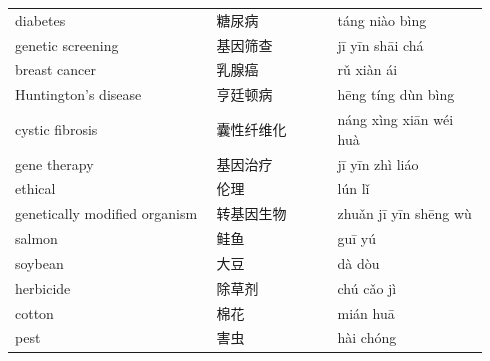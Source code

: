 \documentclass[11pt]{article}
\begin{document}
\begin{longtable}{@{}p{0.40\linewidth}p{0.24\linewidth}p{0.30\linewidth}@{}}
diabetes & 糖尿病 & táng niào bìng \\
genetic screening & 基因筛查 & jī yīn shāi chá \\
breast cancer & 乳腺癌 & rǔ xiàn ái \\
Huntington's disease & 亨廷顿病 & hēng tíng dùn bìng \\
cystic fibrosis & 囊性纤维化 & náng xìng xiān wéi huà \\
gene therapy & 基因治疗 & jī yīn zhì liáo \\
ethical & 伦理 & lún lǐ \\
genetically modified organism & 转基因生物 & zhuǎn jī yīn shēng wù \\
salmon & 鲑鱼 & guī yú \\
soybean & 大豆 & dà dòu \\
herbicide & 除草剂 & chú cǎo jì \\
cotton & 棉花 & mián huā \\
pest & 害虫 & hài chóng \\
\end{longtable}
\end{document}
